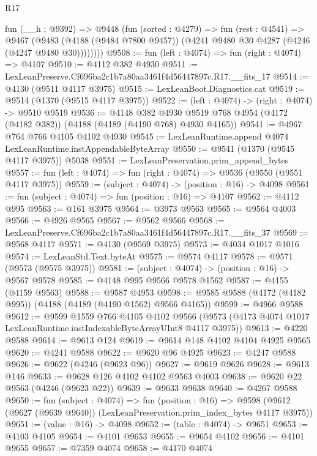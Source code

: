 \begin{lexlean}{R17}
\begin{coremodule}
        fun (__h : @9392) =>
        @9448
          (fun (sorted : @4279) =>
          fun (rest : @4541) =>
          @9467
            (@9483
              (@4188 (@9484 @7800 @9457))
              (@4241 @9480 @30 @4287 (@4246 (@4247 @9480 @30))))))))
@9508 := fun (left : @4074) => fun (right : @4074) => @4107
@9510 := @4112 @382 @4930
@9511 := LexLeanPreserve.Cf696ba2c1b7a80aa3461f4d56447897c.R17.__fits_17
@9514 := @4130 (@9511 @4117 @3975)
@9515 := LexLeanBoot.Diagnostics.cat
@9519 := @9514 (@1370 (@9515 @4117 @3975))
@9522 := (left : @4074) -> (right : @4074) -> @9510 @9519
@9536 := @4148
    @382
    @4930
    @9519
    @768
    @4954
    (@4172 (@4182 @382))
    (@4188 (@4189 (@4190 @768) @4930 @4165))
@9541 := @4967 @764 @766 @4105 @4102 @4930
@9545 := LexLeanRuntime.append @4074 LexLeanRuntime.instAppendableByteArray
@9550 := @9541 (@1370 (@9545 @4117 @3975)) @5038
@9551 := LexLeanPreservation.prim_append_bytes
@9557 := fun (left : @4074) => fun (right : @4074) => @9536 (@9550 (@9551 @4117 @3975))
@9559 := (subject : @4074) -> (position : @16) -> @4098
@9561 := fun (subject : @4074) => fun (position : @16) => @4107
@9562 := @4112 @995
@9563 := @161 @3975
@9564 := @3973 @9563
@9565 := @9564 @4003
@9566 := @4926 @9565
@9567 := @9562 @9566
@9568 := LexLeanPreserve.Cf696ba2c1b7a80aa3461f4d56447897c.R17.__fits_37
@9569 := @9568 @4117
@9571 := @4130 (@9569 @3975)
@9573 := @4034 @1017 @1016
@9574 := LexLeanStd.Text.byteAt
@9575 := @9574 @4117
@9578 := @9571 (@9573 (@9575 @3975))
@9581 := (subject : @4074) -> (position : @16) -> @9567 @9578
@9585 := @4148 @995 @9566 @9578 @1562
@9587 := @4155 (@4159 @9563)
@9588 := @9587 @4953
@9598 := @9585 @9588 (@4172 (@4182 @995)) (@4188 (@4189 (@4190 @1562) @9566 @4165))
@9599 := @4966 @9588
@9612 := @9599
    @1559
    @766
    @4105
    @4102
    @9566
    (@9573 (@4173 @4074 @1017 LexLeanRuntime.instIndexableByteArrayUInt8 @4117 @3975))
@9613 := @4220 @9588
@9614 := @9613 @124
@9619 := @9614 @148 @4102 @4104 @4925 @9565
@9620 := @4241 @9588
@9622 := @9620 @96 @4925
@9623 := @4247 @9588
@9626 := @9622 (@4246 (@9623 @96))
@9627 := @9619 @9626
@9628 := @9613 @146
@9633 := @9628 @126 @4102 @4102 @9563 @4003
@9638 := @9620 @22 @9563 (@4246 (@9623 @22))
@9639 := @9633 @9638
@9640 := @4267 @9588
@9650 := fun (subject : @4074) =>
  fun (position : @16) =>
  @9598 (@9612 (@9627 (@9639 @9640)) (LexLeanPreservation.prim_index_bytes @4117 @3975))
@9651 := (value : @16) -> @4098
@9652 := (table : @4074) -> @9651
@9653 := @4103 @4105
@9654 := @4101 @9653
@9655 := @9654 @4102
@9656 := @4101 @9655
@9657 := @7359 @4074
@9658 := @4170 @4074

\end{coremodule}
\end{lexlean}
